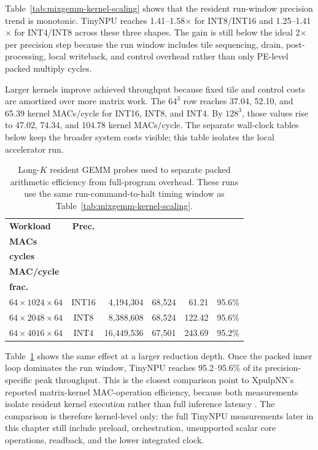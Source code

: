 \documentclass[a4paper, 12pt, titlepage]{article}
\begin{document}
Table~\ref{tab:mixgemm-kernel-scaling} shows that the resident run-window precision trend is monotonic. TinyNPU reaches 1.41--1.58$\times$ for INT8/INT16 and 1.25--1.41$\times$ for INT4/INT8 across these three shapes. The gain is still below the ideal 2$\times$ per precision step because the run window includes tile sequencing, drain, post-processing, local writeback, and control overhead rather than only PE-level packed multiply cycles.

Larger kernels improve achieved throughput because fixed tile and control costs are amortized over more matrix work. The $64^3$ row reaches 37.04, 52.10, and 65.39 kernel MACs/cycle for INT16, INT8, and INT4. By $128^3$, those values rise to 47.02, 74.34, and 104.78 kernel MACs/cycle. The separate wall-clock tables below keep the broader system costs visible; this table isolates the local accelerator run.

\begin{table}[H]
    \centering
    \footnotesize
    \caption{Long-$K$ resident GEMM probes used to separate packed arithmetic efficiency from full-program overhead. These runs use the same run-command-to-halt timing window as Table~\ref{tab:mixgemm-kernel-scaling}.}
    \label{tab:long-k-resident-gemm}
    \begin{tabular}{|l|c|r|r|r|r|}
        \hline
        \textbf{Workload} & \textbf{Prec.} & \makecell{\textbf{Logical}\\\textbf{MACs}} & \makecell{\textbf{Kernel}\\\textbf{cycles}} & \makecell{\textbf{Kernel}\\\textbf{MAC/cycle}} & \makecell{\textbf{Peak}\\\textbf{frac.}} \\
        \hline
        $64 \times 1024 \times 64$ & INT16 & 4,194,304 & 68,524 & 61.21 & 95.6\% \\
        \hline
        $64 \times 2048 \times 64$ & INT8 & 8,388,608 & 68,524 & 122.42 & 95.6\% \\
        \hline
        $64 \times 4016 \times 64$ & INT4 & 16,449,536 & 67,501 & 243.69 & 95.2\% \\
        \hline
    \end{tabular}
\end{table}

Table~\ref{tab:long-k-resident-gemm} shows the same effect at a larger reduction depth. Once the packed inner loop dominates the run window, TinyNPU reaches 95.2--95.6\% of its precision-specific peak throughput. This is the closest comparison point to XpulpNN's reported matrix-kernel MAC-operation efficiency, because both measurements isolate resident kernel execution rather than full inference latency \cite{garofalo2021xpulpnn}. The comparison is therefore kernel-level only: the full TinyNPU measurements later in this chapter still include preload, orchestration, unsupported scalar core operations, readback, and the lower integrated clock.
\end{document}
